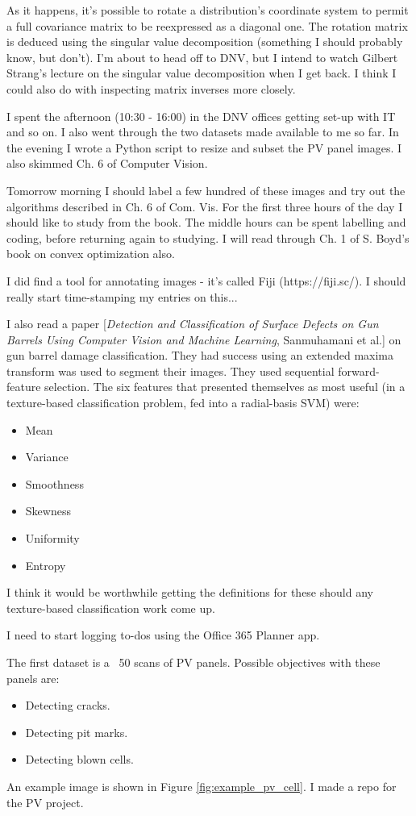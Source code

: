\documentclass[idxtotoc,hyperref,openany]{labbook} %
\begin{document}
As it happens, it's possible to rotate a distribution's coordinate system to permit a full covariance matrix to be reexpressed as a diagonal one. The rotation matrix is deduced using the singular value decomposition (something I should probably know, but don't). I'm about to head off to DNV, but I intend to watch Gilbert Strang's lecture on the singular value decomposition when I get back. I think I could also do with inspecting matrix inverses more closely.

I spent the afternoon (10:30 - 16:00) in the DNV offices getting set-up with IT and so on. I also went through the two datasets made available to me so far. In the evening I wrote a Python script to resize and subset the PV panel images. I also skimmed Ch. 6 of Computer Vision.

Tomorrow morning I should label a few hundred of these images and try out the algorithms described in Ch. 6 of Com. Vis. For the first three hours of the day I should like to study from the book. The middle hours can be spent labelling and coding, before returning again to studying. I will read through Ch. 1 of S. Boyd's book on convex optimization also.

I did find a tool for annotating images - it's called Fiji (https://fiji.sc/). I should really start time-stamping my entries on this...

I also read a paper [\emph{Detection and Classification of Surface Defects on Gun Barrels Using Computer Vision and Machine Learning}, Sanmuhamani et al.] on gun barrel damage classification. They had success using an extended maxima transform was used to segment their images. They used sequential forward-feature selection. The six features that presented themselves as most useful (in a texture-based classification problem, fed into a radial-basis SVM) were:
\begin{itemize}
	\item Mean
	\item Variance
	\item Smoothness
	\item Skewness
	\item Uniformity
	\item Entropy
\end{itemize}
I think it would be worthwhile getting the definitions for these should any texture-based classification work come up.

I need to start logging to-dos using the Office 365 Planner app.

The first dataset is a ~50 scans of PV panels. Possible objectives with these panels are:
\begin{itemize}
	\item Detecting cracks.
	\item Detecting pit marks.
	\item Detecting blown cells.
\end{itemize}
An example image is shown in Figure \ref{fig:example_pv_cell}. I made a repo for the PV project.
\end{document}
